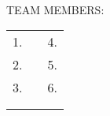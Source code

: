 \pagebreak
\begin{flushleft} 
\textbf{} \\ 
 \end{flushleft}
 
 \vspace{12pt}
\noindent TEAM MEMBERS:\\ 
\vspace{12pt}
\begin{tabular}{p{2in}p{1in}p{2in}}
1. \hrulefill & & 4. \hrulefill  \\
2. \hrulefill & & 5. \hrulefill  \\
3. \hrulefill & & 6. \hrulefill  \\ \\ \\
\end{tabular}

\renewcommand{\labelenumi}{\arabic{enumi}.}

